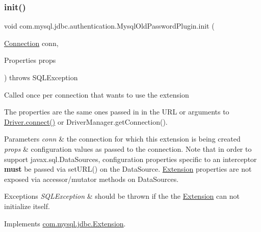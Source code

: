 \subsubsection{\texorpdfstring{init()}{init()}}
{\footnotesize\ttfamily void com.\+mysql.\+jdbc.\+authentication.\+Mysql\+Old\+Password\+Plugin.\+init (\begin{DoxyParamCaption}\item[{\mbox{\hyperlink{interfacecom_1_1mysql_1_1jdbc_1_1_connection}{Connection}}}]{conn,  }\item[{Properties}]{props }\end{DoxyParamCaption}) throws S\+Q\+L\+Exception}

Called once per connection that wants to use the extension

The properties are the same ones passed in in the U\+RL or arguments to \mbox{\hyperlink{classcom_1_1mysql_1_1jdbc_1_1_non_registering_driver_a834c012e752a01d1ee435b3461bb8218}{Driver.\+connect()}} or Driver\+Manager.\+get\+Connection().


\begin{DoxyParams}{Parameters}
{\em conn} & the connection for which this extension is being created \\
\hline
{\em props} & configuration values as passed to the connection. Note that in order to support javax.\+sql.\+Data\+Sources, configuration properties specific to an interceptor {\bfseries must} be passed via set\+U\+R\+L() on the Data\+Source. \mbox{\hyperlink{interfacecom_1_1mysql_1_1jdbc_1_1_extension}{Extension}} properties are not exposed via accessor/mutator methods on Data\+Sources.\\
\hline
\end{DoxyParams}

\begin{DoxyExceptions}{Exceptions}
{\em S\+Q\+L\+Exception} & should be thrown if the the \mbox{\hyperlink{interfacecom_1_1mysql_1_1jdbc_1_1_extension}{Extension}} can not initialize itself. \\
\hline
\end{DoxyExceptions}


Implements \mbox{\hyperlink{interfacecom_1_1mysql_1_1jdbc_1_1_extension_a79427811058193260bd4df0c38414e88}{com.\+mysql.\+jdbc.\+Extension}}.

\mbox{\label{classcom_1_1mysql_1_1jdbc_1_1authentication_1_1_mysql_old_password_plugin_a66202ca57be0da786649bf07b3ea75d2}} 
